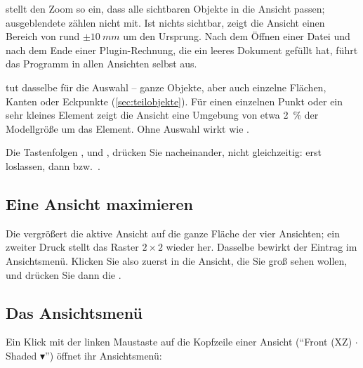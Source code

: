  stellt den Zoom so ein, dass alle sichtbaren Objekte in die Ansicht passen;
ausgeblendete zählen nicht mit. Ist nichts sichtbar, zeigt die Ansicht einen Bereich von
rund $\pm\SI{10}{mm}$ um den Ursprung. Nach dem
Öffnen einer Datei und nach dem Ende einer Plugin-Rechnung, die ein leeres Dokument gefüllt
hat, führt das Programm  in allen Ansichten selbst aus.

 tut dasselbe für die Auswahl -- ganze Objekte, aber auch einzelne Flächen,
Kanten oder Eckpunkte (\autoref{sec:teilobjekte}). Für einen einzelnen Punkt oder ein sehr
kleines Element zeigt die Ansicht eine Umgebung von etwa \SI{2}{\percent} der Modellgröße um
das Element. Ohne Auswahl wirkt  wie .

\begin{hinweis}
Die Tastenfolgen ,  und ,  drücken Sie nacheinander, nicht
gleichzeitig: erst  loslassen, dann  bzw.\ .
\end{hinweis}

\subsection{Eine Ansicht maximieren}\label{sec:maximieren}

Die  vergrößert die aktive Ansicht auf die ganze Fläche der vier Ansichten;
ein zweiter Druck stellt das Raster $2 \times 2$ wieder her. Dasselbe bewirkt der Eintrag
 im Ansichtsmenü. Klicken Sie also zuerst in die Ansicht, die
Sie groß sehen wollen, und drücken Sie dann die .

\subsection{Das Ansichtsmenü}\label{sec:ansichtsmenue}

Ein Klick mit der linken Maustaste auf die Kopfzeile einer Ansicht (\enquote{Front (XZ)
$\cdot$ Shaded $\blacktriangledown$}) öffnet ihr Ansichtsmenü:


